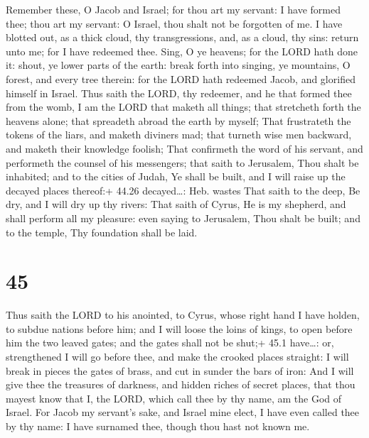  Remember these, O Jacob and Israel; for thou art my
servant: I have formed thee; thou art my servant: O Israel, thou shalt
not be forgotten of me.  I have blotted out, as a thick
cloud, thy transgressions, and, as a cloud, thy sins: return unto me;
for I have redeemed thee.  Sing, O ye heavens; for the LORD
hath done it: shout, ye lower parts of the earth: break forth into
singing, ye mountains, O forest, and every tree therein: for the LORD
hath redeemed Jacob, and glorified himself in Israel.  Thus
saith the LORD, thy redeemer, and he that formed thee from the womb, I
am the LORD that maketh all things; that stretcheth forth the heavens
alone; that spreadeth abroad the earth by myself;  That
frustrateth the tokens of the liars, and maketh diviners mad; that
turneth wise men backward, and maketh their knowledge foolish;
 That confirmeth the word of his servant, and performeth
the counsel of his messengers; that saith to Jerusalem, Thou shalt be
inhabited; and to the cities of Judah, Ye shall be built, and I will
raise up the decayed places thereof:+ 44.26 decayed\ldots: Heb. wastes
 That saith to the deep, Be dry, and I will dry up thy
rivers:  That saith of Cyrus, He is my shepherd, and shall
perform all my pleasure: even saying to Jerusalem, Thou shalt be built;
and to the temple, Thy foundation shall be laid.

\hypertarget{section-44}{%
\section{45}\label{section-44}}

 Thus saith the LORD to his anointed, to Cyrus, whose right
hand I have holden, to subdue nations before him; and I will loose the
loins of kings, to open before him the two leaved gates; and the gates
shall not be shut;+ 45.1 have\ldots: or, strengthened  I
will go before thee, and make the crooked places straight: I will break
in pieces the gates of brass, and cut in sunder the bars of iron:
 And I will give thee the treasures of darkness, and hidden
riches of secret places, that thou mayest know that I, the LORD, which
call thee by thy name, am the God of Israel.  For Jacob my
servant's sake, and Israel mine elect, I have even called thee by thy
name: I have surnamed thee, though thou hast not known me.

